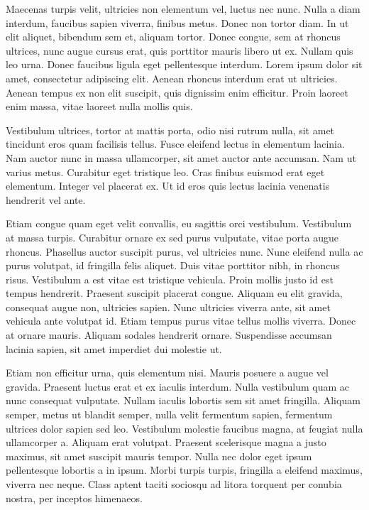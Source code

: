 \documentclass[
  a5paper,
  smalldemyvopaper,10pt,twoside,onecolumn,openright,extrafontsizes,hidelinks]{memoir}
\begin{document}
Maecenas turpis velit, ultricies non elementum vel, luctus nec nunc.
Nulla a diam interdum, faucibus sapien viverra, finibus metus. Donec non
tortor diam. In ut elit aliquet, bibendum sem et, aliquam tortor. Donec
congue, sem at rhoncus ultrices, nunc augue cursus erat, quis porttitor
mauris libero ut ex. Nullam quis leo urna. Donec faucibus ligula eget
pellentesque interdum. Lorem ipsum dolor sit amet, consectetur
adipiscing elit. Aenean rhoncus interdum erat ut ultricies. Aenean
tempus ex non elit suscipit, quis dignissim enim efficitur. Proin
laoreet enim massa, vitae laoreet nulla mollis quis.

Vestibulum ultrices, tortor at mattis porta, odio nisi rutrum nulla, sit
amet tincidunt eros quam facilisis tellus. Fusce eleifend lectus in
elementum lacinia. Nam auctor nunc in massa ullamcorper, sit amet auctor
ante accumsan. Nam ut varius metus. Curabitur eget tristique leo. Cras
finibus euismod erat eget elementum. Integer vel placerat ex. Ut id eros
quis lectus lacinia venenatis hendrerit vel ante.

Etiam congue quam eget velit convallis, eu sagittis orci vestibulum.
Vestibulum at massa turpis. Curabitur ornare ex sed purus vulputate,
vitae porta augue rhoncus. Phasellus auctor suscipit purus, vel
ultricies nunc. Nunc eleifend nulla ac purus volutpat, id fringilla
felis aliquet. Duis vitae porttitor nibh, in rhoncus risus. Vestibulum a
est vitae est tristique vehicula. Proin mollis justo id est tempus
hendrerit. Praesent suscipit placerat congue. Aliquam eu elit gravida,
consequat augue non, ultricies sapien. Nunc ultricies viverra ante, sit
amet vehicula ante volutpat id. Etiam tempus purus vitae tellus mollis
viverra. Donec at ornare mauris. Aliquam sodales hendrerit ornare.
Suspendisse accumsan lacinia sapien, sit amet imperdiet dui molestie ut.

Etiam non efficitur urna, quis elementum nisi. Mauris posuere a augue
vel gravida. Praesent luctus erat et ex iaculis interdum. Nulla
vestibulum quam ac nunc consequat vulputate. Nullam iaculis lobortis sem
sit amet fringilla. Aliquam semper, metus ut blandit semper, nulla velit
fermentum sapien, fermentum ultrices dolor sapien sed leo. Vestibulum
molestie faucibus magna, at feugiat nulla ullamcorper a. Aliquam erat
volutpat. Praesent scelerisque magna a justo maximus, sit amet suscipit
mauris tempor. Nulla nec dolor eget ipsum pellentesque lobortis a in
ipsum. Morbi turpis turpis, fringilla a eleifend maximus, viverra nec
neque. Class aptent taciti sociosqu ad litora torquent per conubia
nostra, per inceptos himenaeos.
\end{document}

